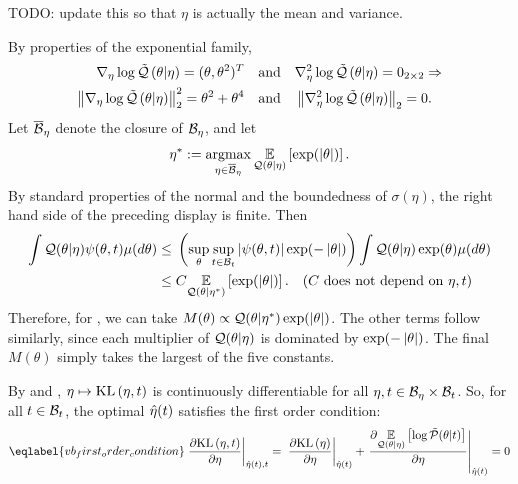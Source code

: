

%
TODO: update this so that $\eta$ is actually the mean and variance.

By properties of the exponential family,
%
\begin{align*}
%
\lqgrad{\theta \vert \eta} ={} (\theta, \theta^2)^T \mathand&
\lqhess{\theta \vert \eta} ={} 0_{2\times2} \Rightarrow\\
%
\norm{\lqgrad{\theta \vert \eta}}_2^2 ={} \theta^2 + \theta^4 \mathand&
\norm{\lqhess{\theta \vert \eta}}_2 ={} 0.
%
\end{align*}
%
Let $\overline{\mathcal{B}}_\eta$ denote the closure of $\mathcal{B}_\eta$, and let
%
\begin{align*}
%
\eta^* := \argmax_{\eta \in \ballclosed_\eta}
    \expect{\q(\theta \vert \eta)}{\exp(\abs{\theta})}.
%
\end{align*}
%
By standard properties of the normal and the boundedness of $\sigma(\eta)$, the
right hand side of the preceding display is finite.
%
Then
%
\begin{align*}
\int \q(\theta \vert \eta) \psi(\theta, \t) \mu(d \theta) \le{}&
    \left( \sup_{\theta} \sup_{\t \in \ball_\t}
        \abs{\psi(\theta, \t)} \exp(-\abs{\theta}) \right)
    \int \q(\theta \vert \eta) \exp(\theta) \mu(d \theta)
%
\\\le{}&
    \const
    \expect{\q(\theta \vert \eta^*)}{\exp(\abs{\theta})}.
    \quad\constdesc{\eta, \t}
%
\end{align*}
%
Therefore, for , we can take $M(\theta)
\propto \mathcal{Q}(\theta \vert \eta^*) \exp(\left|\theta\right|)$. The other terms follow
similarly, since each multiplier of $\mathcal{Q}(\theta \vert \eta)$ is dominated by
$\exp(-\left|\theta\right|)$.  The final $M(\theta)$ simply takes the largest
of the five constants.
%

\vspace{1em}


%
By  and , $\eta
\mapsto \mathrm{KL}\left(\eta, t\right)$ is continuously differentiable for all $\eta, t \in
\mathcal{B}_\eta \times \mathcal{B}_t$.  So, for all $t \in \mathcal{B}_t$, the optimal
$\hat\eta(t)$ satisfies the first order condition:
%
\begin{align}\eqlabel{vb_first_order_condition}
%
\fracat{\partial \KL{\eta, \t}}{ \partial \eta}{\etaopt(\t), \t} ={}
\fracat{\partial \KL{\eta}}{ \partial \eta}{\etaopt(\t)} +
\fracat{\partial
    \expect{\q(\theta \vert \eta)}{\log \ptil(\theta \vert \t)}}
    {\partial \eta}
    {\etaopt(\t)}
={} 0
%
\end{align}

